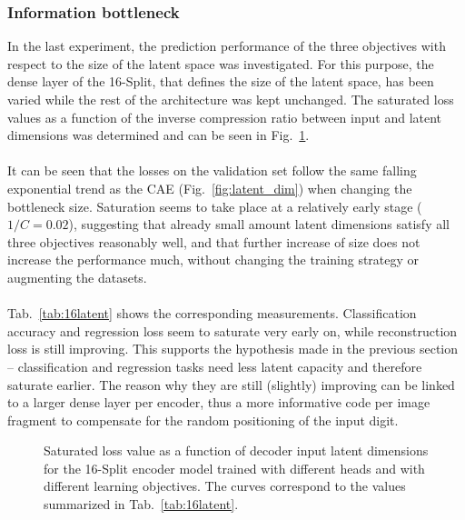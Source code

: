 \documentclass[../../main.tex]{subfiles}
\begin{document}
\subsubsection{Information bottleneck}\label{sec:inf_bott}
In the last experiment, the prediction performance of the three objectives with respect to the size of the latent space was investigated. For this purpose, the dense layer of the 16-Split, that defines the size of the latent space, has been varied while the rest of the architecture was kept unchanged. The saturated loss values as a function of the inverse compression ratio between input and latent dimensions was determined and can be seen in Fig.~\ref{fig:sum16s}.\\
\\
It can be seen that the losses on the validation set follow the same falling exponential trend as the CAE (Fig.~\ref{fig:latent_dim}) when changing the bottleneck size. Saturation seems to take place at a relatively early stage ($1/C=0.02$), suggesting that already small amount latent dimensions satisfy all three objectives reasonably well, and that further increase of size does not increase the performance much, without changing the training strategy or augmenting the datasets.\\
\\
Tab.~\ref{tab:16latent} shows the corresponding measurements. Classification accuracy and regression loss seem to saturate very early on, while reconstruction loss is still improving. This supports the hypothesis made in the previous section -- classification and regression tasks need less latent capacity and therefore saturate earlier. The reason why they are still (slightly) improving can be linked to a larger dense layer per encoder, thus a more informative code per image fragment to compensate for the random positioning of the input digit.\\
\begin{figure}[htp]
	\centering
	\hspace{4mm}
	\hspace{4mm}
	\caption{Saturated loss value as a function of decoder input latent dimensions for the 16-Split encoder model trained with different heads and with different learning objectives. The curves correspond to the values summarized in Tab.~\ref{tab:16latent}.}
	\label{fig:sum16s}
\end{figure}
\end{document}
